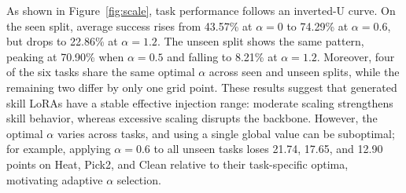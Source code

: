 \documentclass{llmxive}
\providecommand{\textttt}[1]{\texttt{#1}}
\providecommand{\method}{\textbf{\textttt{LatentSkill}}}
\begin{document}
As shown in Figure~\ref{fig:scale}, task performance follows an inverted-U curve. On the seen split, average success rises from 43.57\% at $\alpha{=}0$ to 74.29\% at $\alpha{=}0.6$, but drops to 22.86\% at $\alpha{=}1.2$. The unseen split shows the same pattern, peaking at 70.90\% when $\alpha{=}0.5$ and falling to 8.21\% at $\alpha{=}1.2$. Moreover, four of the six tasks share the same optimal $\alpha$ across seen and unseen splits, while the remaining two differ by only one grid point. These results suggest that generated skill LoRAs have a stable effective injection range: moderate scaling strengthens skill behavior, whereas excessive scaling disrupts the backbone.
However, the optimal $\alpha$ varies across tasks, and using a single global value can be suboptimal; for example, applying $\alpha{=}0.6$ to all unseen tasks loses 21.74, 17.65, and 12.90 points on Heat, Pick2, and Clean relative to their task-specific optima, motivating adaptive $\alpha$ selection.
\end{document}
